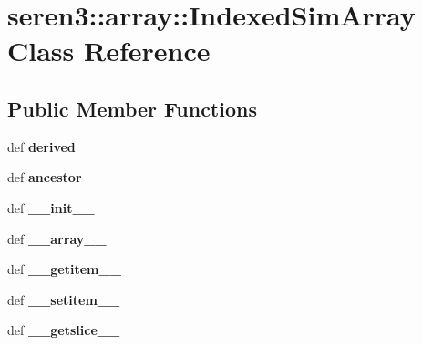 \hypertarget{classseren3_1_1array_1_1IndexedSimArray}{
\section{seren3::array::IndexedSimArray Class Reference}
\label{classseren3_1_1array_1_1IndexedSimArray}
}
\subsection*{Public Member Functions}
\begin{DoxyCompactItemize}
\item 
\hypertarget{classseren3_1_1array_1_1IndexedSimArray_a06115ec18702b4c151de670c55100254}{
def {\bfseries derived}}
\label{classseren3_1_1array_1_1IndexedSimArray_a06115ec18702b4c151de670c55100254}

\item 
\hypertarget{classseren3_1_1array_1_1IndexedSimArray_a0bd82a5e6440935a2c84267a7a240479}{
def {\bfseries ancestor}}
\label{classseren3_1_1array_1_1IndexedSimArray_a0bd82a5e6440935a2c84267a7a240479}

\item 
\hypertarget{classseren3_1_1array_1_1IndexedSimArray_adf52a16fdd5c82c32ea48ec742a1c589}{
def {\bfseries \_\-\_\-init\_\-\_\-}}
\label{classseren3_1_1array_1_1IndexedSimArray_adf52a16fdd5c82c32ea48ec742a1c589}

\item 
\hypertarget{classseren3_1_1array_1_1IndexedSimArray_a46475ecc23f53626715334c0823416e9}{
def {\bfseries \_\-\_\-array\_\-\_\-}}
\label{classseren3_1_1array_1_1IndexedSimArray_a46475ecc23f53626715334c0823416e9}

\item 
\hypertarget{classseren3_1_1array_1_1IndexedSimArray_ac74ad8e2660289777c1aecd993ff8ffc}{
def {\bfseries \_\-\_\-getitem\_\-\_\-}}
\label{classseren3_1_1array_1_1IndexedSimArray_ac74ad8e2660289777c1aecd993ff8ffc}

\item 
\hypertarget{classseren3_1_1array_1_1IndexedSimArray_a6d5d06445841e80d744f1250c594133f}{
def {\bfseries \_\-\_\-setitem\_\-\_\-}}
\label{classseren3_1_1array_1_1IndexedSimArray_a6d5d06445841e80d744f1250c594133f}

\item 
\hypertarget{classseren3_1_1array_1_1IndexedSimArray_a18ac0ed9c1664070024efddb46f4a041}{
def {\bfseries \_\-\_\-getslice\_\-\_\-}}
\label{classseren3_1_1array_1_1IndexedSimArray_a18ac0ed9c1664070024efddb46f4a041}


\end{DoxyCompactItemize}
